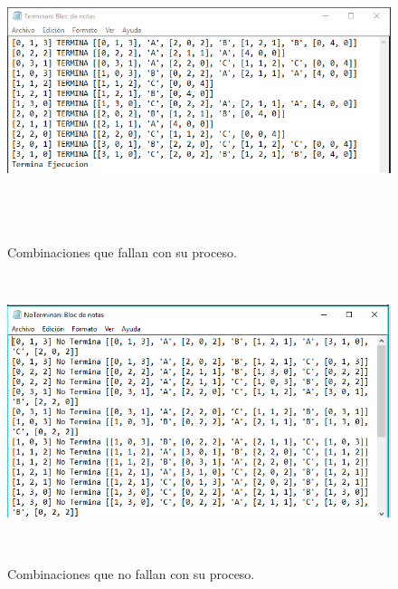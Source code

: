 \documentclass[12pt]{article}
\begin{document}
\begin{figure}[H]
\begin{center}
\includegraphics[width=\textwidth, height=8cm]{auto_planetas_fallan}
\label{ }
\caption{Combinaciones que fallan con su proceso.}
\end{center}
\end{figure}

\begin{figure}[H]
\begin{center}
\includegraphics[width=\textwidth, height=8cm]{auto_planetas_nofallan}
\label{ }
\caption{Combinaciones que no fallan con su proceso.}
\end{center}
\end{figure}
\end{document}
